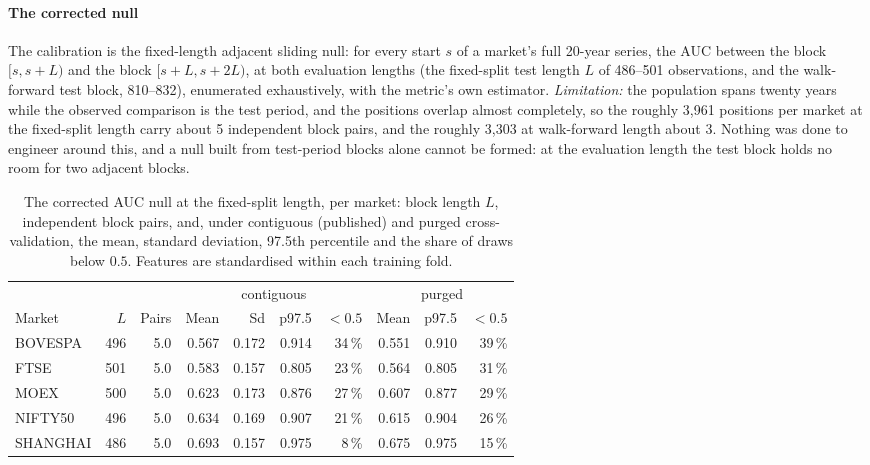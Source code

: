 \documentclass[11pt,a4paper]{article}
\makeatletter
\DeclareRobustCommand{\_}{\ifmmode\nfss@text{\textunderscore}\else\textunderscore\allowbreak\fi}
\makeatother
\begin{document}
\paragraph{The corrected null} The calibration is the fixed-length adjacent sliding null: for every start $s$ of a market's full 20-year series, the AUC between the block $[s,s+L)$ and the block $[s+L,s+2L)$, at both evaluation lengths (the fixed-split test length $L$ of 486--501 observations, and the walk-forward test block, 810--832), enumerated exhaustively, with the metric's own estimator. \emph{Limitation:} the population spans twenty years while the observed comparison is the test period, and the positions overlap almost completely, so the roughly 3{,}961 positions per market at the fixed-split length carry about 5 independent block pairs, and the roughly 3{,}303 at walk-forward length about 3. Nothing was done to engineer around this, and a null built from test-period blocks alone cannot be formed: at the evaluation length the test block holds no room for two adjacent blocks.

\begin{table}[htbp]
\centering
\caption{The corrected AUC null at the fixed-split length, per market: block length $L$, independent block pairs, and, under contiguous (published) and purged cross-validation, the mean, standard deviation, 97.5th percentile and the share of draws below $0.5$. Features are standardised within each training fold.}
\label{tab:nulls}
{\footnotesize
\setlength{\tabcolsep}{3.5pt}
\begin{tabular}{@{}lrrrrrrrrr@{}}
\toprule
 & & & \multicolumn{4}{c}{contiguous} & \multicolumn{3}{c}{purged} \\
\cmidrule(lr){4-7}\cmidrule(l){8-10}
Market & $L$ & Pairs & Mean & Sd & p97.5 & $<0.5$ & Mean & p97.5 & $<0.5$ \\
\midrule
BOVESPA & 496 & 5.0 & 0.567 & 0.172 & 0.914 & 34\,\% & 0.551 & 0.910 & 39\,\% \\
FTSE & 501 & 5.0 & 0.583 & 0.157 & 0.805 & 23\,\% & 0.564 & 0.805 & 31\,\% \\
MOEX & 500 & 5.0 & 0.623 & 0.173 & 0.876 & 27\,\% & 0.607 & 0.877 & 29\,\% \\
NIFTY50 & 496 & 5.0 & 0.634 & 0.169 & 0.907 & 21\,\% & 0.615 & 0.904 & 26\,\% \\
SHANGHAI & 486 & 5.0 & 0.693 & 0.157 & 0.975 & 8\,\% & 0.675 & 0.975 & 15\,\% \\
\bottomrule
\end{tabular}}
\end{table}
\end{document}
